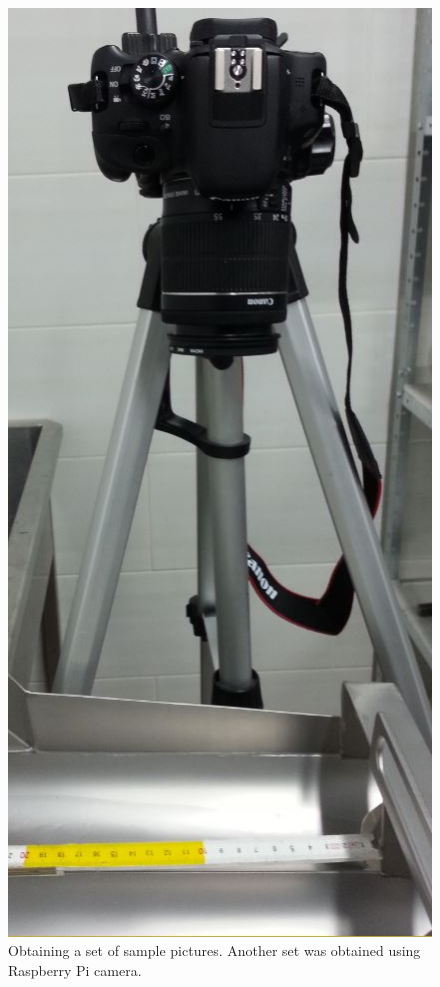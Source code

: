 \documentclass[12pt,twoside,a4paper]{article}
\begin{document}
\begin{figure}[H]
\centering
\includegraphics[width=0.3\paperwidth]{samples}
\caption{Obtaining a set of sample pictures. Another set was obtained using Raspberry Pi camera.}\label{fig:samples}
\end{figure}
\end{document}
